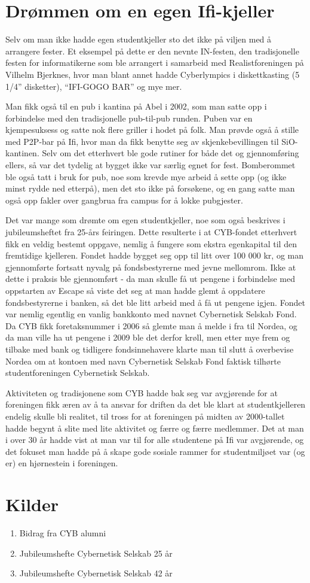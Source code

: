 \newpage

\section{Drømmen om en egen Ifi-kjeller}

Selv om man ikke hadde egen studentkjeller sto det ikke på viljen med å arrangere fester. Et eksempel på dette er den nevnte IN-festen, den tradisjonelle festen for informatikerne som ble arrangert i samarbeid med Realistforeningen på Vilhelm Bjerknes, hvor man blant annet hadde Cyberlympics i diskettkasting (5 1/4'' disketter), ``IFI-GOGO BAR'' og mye mer. 

Man fikk også til en pub i kantina på Abel i 2002, som man satte opp i forbindelse med den tradisjonelle pub-til-pub runden. Puben var en kjempesuksess og satte nok flere griller i hodet på folk. Man prøvde også å stille med P2P-bar på Ifi, hvor man da fikk benytte seg av skjenkebevillingen til SiO-kantinen. Selv om det etterhvert ble gode rutiner for både det og gjennomføring ellers, så var det tydelig at bygget ikke var særlig egnet for fest. Bomberommet ble også tatt i bruk for pub, noe som krevde mye arbeid å sette opp (og ikke minst rydde ned etterpå), men det sto ikke på forsøkene, og en gang satte man også opp fakler over gangbrua fra campus for å lokke pubgjester.

Det var mange som drømte om egen studentkjeller, noe som også beskrives i jubileumsheftet fra 25-års feiringen. Dette resulterte i at CYB-fondet etterhvert fikk en veldig bestemt oppgave, nemlig å fungere som ekstra egenkapital til den fremtidige kjelleren. Fondet hadde bygget seg opp til litt over 100 000 kr, og man gjennomførte fortsatt nyvalg på fondsbestyrerne med jevne mellomrom. Ikke at dette i praksis ble gjennomført - da man skulle få ut pengene i forbindelse med oppstarten av Escape så viste det seg at man hadde glemt å oppdatere fondsbestyrerne i banken, så det ble litt arbeid med å få ut pengene igjen. Fondet var nemlig egentlig en vanlig bankkonto med navnet Cybernetisk Selskab Fond. Da CYB fikk foretaksnummer i 2006 så glemte man å melde i fra til Nordea, og da man ville ha ut pengene i 2009 ble det derfor krøll, men etter mye frem og tilbake med bank og tidligere fondsinnehavere klarte man til slutt å overbevise Nordea om at kontoen med navn Cybernetisk Selskab Fond faktisk tilhørte studentforeningen Cybernetisk Selskab.

Aktiviteten og tradisjonene som CYB hadde bak seg var avgjørende for at foreningen fikk æren av å ta ansvar for driften da det ble klart at studentkjelleren endelig skulle bli realitet, til tross for at foreningen på midten av 2000-tallet hadde begynt å slite med lite aktivitet og færre og færre medlemmer. Det at man i over 30 år hadde vist at man var til for alle studentene på Ifi var avgjørende, og det fokuset man hadde på å skape gode sosiale rammer for studentmiljøet var (og er) en hjørnestein i foreningen.

\section*{Kilder}

\begin{enumerate}
	\item Bidrag fra CYB alumni
	\item Jubileumshefte Cybernetisk Selskab 25 år
	\item Jubileumshefte Cybernetisk Selskab 42 år
\end{enumerate}
